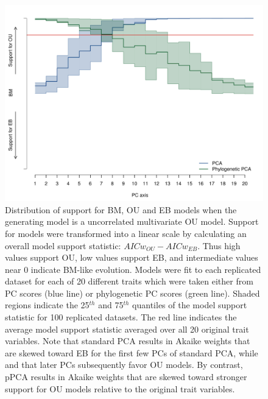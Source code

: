 \documentclass[a4paper,11pt]{article}
\begin{document}
\begin{figure}[p]
\centering
\includegraphics[scale=0.65]{./fig/uncor-ou-aic.pdf}
\caption{Distribution of support for BM, OU and EB models when the generating model is a uncorrelated multivariate OU model. Support for models were transformed into a linear scale by calculating an overall model support statistic: $AICw_{OU} - AICw_{EB}$. Thus high values support OU, low values support EB, and intermediate values near 0 indicate BM-like evolution. Models were fit to each replicated dataset for each of 20 different traits which were taken either from PC scores (blue line) or phylogenetic PC scores (green line). Shaded regions indicate the 25$^{th}$ and 75$^{th}$ quantiles of the model support statistic for 100 replicated datasets. The red line indicates the average model support statistic averaged over all 20 original trait variables. Note that standard PCA results in Akaike weights that are skewed toward EB for the first few PCs of standard PCA, while  and that later PCs subsequently favor OU models. By contrast, pPCA results in Akaike weights that are skewed toward stronger support for OU models relative to the original trait variables.}
\label{oufit}
\end{figure}
\end{document}

